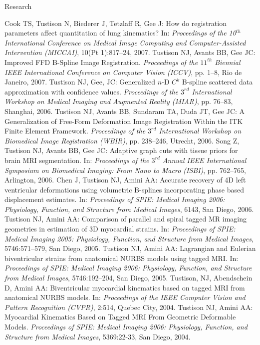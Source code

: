 \documentclass{resume}
\begin{document}
\begin{category}{Research}
\begin{itemize}
    \citemnobullet  Cook TS, Tustison N, Biederer J, Tetzlaff R, Gee J: How do registration parameters affect quantitation of lung kinematics? In:  {\em Proceedings of the 10$^{th}$ International Conference on Medical Image Computing and Computer-Assisted Intervention (MICCAI)}, 10(Pt 1):817--24, 2007.
    \citemnobullet Tustison NJ, Avants BB, Gee JC: Improved FFD B-Spline Image Registration. {\em Proceedings of the $11^{th}$ Biennial IEEE International Conference on Computer Vision (ICCV)}, pp. 1--8, Rio de Janeiro, 2007.
    \citemnobullet  Tustison NJ, Gee, JC: Generalized $n$-D $C^k$ B-spline scattered data approximation with confidence values. {\em Proceedings of the $3^{rd}$ International Workshop on Medical Imaging and Augmented Reality (MIAR)}, pp. 76--83, Shanghai, 2006.
    \citemnobullet  Tustison NJ, Avants BB, Sundaram TA, Duda JT, Gee JC: A Generalization of Free-Form Deformation Image Registration Within the ITK Finite Element Framework. {\em Proceedings of the $3^{rd}$ International Workshop on Biomedical Image Registration (WBIR)}, pp. 238--246, Utrecht, 2006.
    \citemnobullet  Song Z, Tustison NJ, Avants BB, Gee JC: Adaptive graph cuts with tissue priors for brain MRI segmentation. In:  {\em Proceedings of the $3^{rd}$ Annual IEEE International Symposium on Biomedical Imaging: From Nano to Macro (ISBI)}, pp. 762--765, Arlington, 2006.
    \citemnobullet  Chen J, Tustison NJ, Amini AA: Accurate recovery of 4D left ventricular deformations using volumetric B-splines incorporating phase based displacement estimates. In: {\em Proceedings of SPIE:  Medical Imaging 2006:  Physiology, Function, and Structure from Medical Images}, 6143, San Diego, 2006.
    \citemnobullet  Tustison NJ, Amini AA: Comparison of parallel and spiral tagged MR imaging geometries in estimation of 3D myocardial strains. In: {\em Proceedings of SPIE:  Medical Imaging 2005:  Physiology, Function, and Structure from Medical Images}, 5746:571--579, San Diego, 2005.
    \citemnobullet  Tustison NJ, Amini AA: Lagrangian and Eulerian biventricular strains from anatomical NURBS models using tagged MRI. In: {\em Proceedings of SPIE:  Medical Imaging 2006:  Physiology, Function, and Structure from Medical Images},  5746:192--204, San Diego, 2005.
    \citemnobullet  Tustison, NJ, Abendschein D, Amini AA: Biventricular myocardial kinematics based on tagged MRI from anatomical NURBS models. In:  {\em Proceedings of the IEEE Computer Vision and Pattern Recognition (CVPR)}, 2:514, Quebec City, 2004.
    \citemnobullet  Tustison NJ, Amini AA: Myocardial Kinematics Based on Tagged MRI From Geometric Deformable Models. {\em Proceedings of SPIE:  Medical Imaging 2006:  Physiology, Function, and Structure from Medical Images}, 5369:22-33, San Diego, 2004.

\end{itemize}
\end{category}
\end{document}
